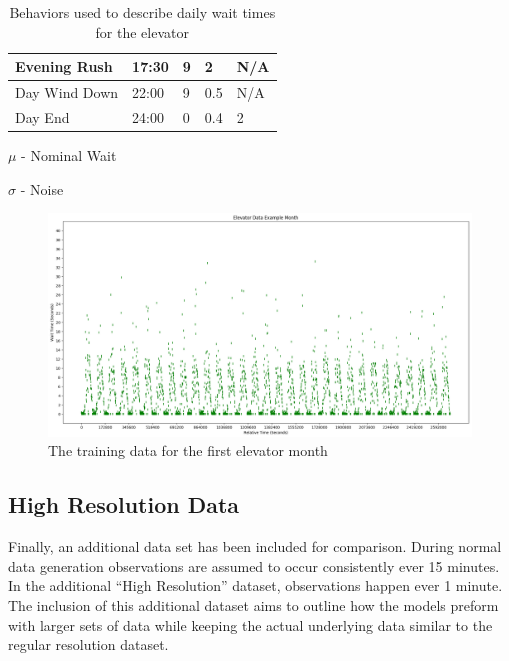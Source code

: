 \begin{table}[!htb]
\begin{tabular}{|l|l|l|l|l|}
      Evening Rush           & 17:30    & 9                                 & 2                             & N/A      \\ \hline
      Day Wind Down          & 22:00    & 9                                 & 0.5                           & N/A      \\ \hline
      Day End                & 24:00    & 0                                 & 0.4                           & 2        \\ \hline
    \end{tabular}
    \begin{tablenotes}
      \small
      \item $\mu$ - Nominal Wait
      \item $\sigma$ - Noise
    \end{tablenotes}
    \caption{Behaviors used to describe daily wait times for the elevator}
    \label{table:elevator_day_t}
  \end{table}



  \begin{figure}[!htb]
    \centering
    \includegraphics[width=\linewidth]{images/Elevator_Data_Example_Month.png}
    \caption{The training data for the first elevator month}
    \label{figure:Elevator Training Data}
  \end{figure}


  \subsection{ High Resolution Data }

  Finally, an additional data set has been included for comparison. During
  normal data generation observations are assumed to occur consistently ever
  15 minutes. In the additional ``High Resolution'' dataset, observations happen
  ever 1 minute. The inclusion of this additional dataset aims to outline how
  the models preform with larger sets of data while keeping the actual
  underlying data similar to the regular resolution dataset.


